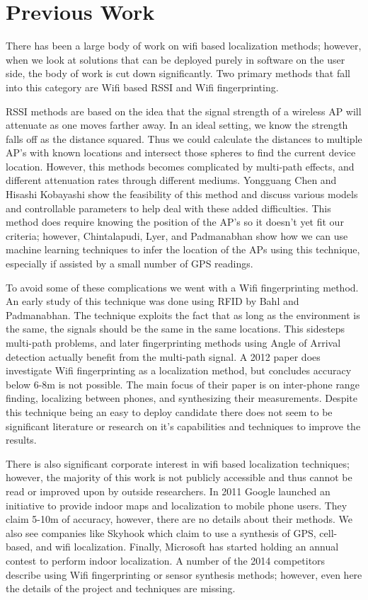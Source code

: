 \documentclass[11pt]{article}
\begin{document}
\section{Previous Work}
There has been a large body of work on wifi based localization methods; however, when we look at solutions that can be deployed purely in software on the user side, the body of work is cut down significantly. Two primary methods that fall into this category are Wifi based RSSI and Wifi fingerprinting.

RSSI methods are based on the idea that the signal strength of a wireless AP will attenuate as one moves farther away. In an ideal setting, we know the strength falls off as the distance squared. Thus we could calculate the distances to multiple AP's with known locations and intersect those spheres to find the current device location. However, this methods becomes complicated by multi-path effects, and different attenuation rates through different mediums. Yongguang Chen and Hisashi Kobayashi show the feasibility of this method and discuss various models and controllable parameters to help deal with these added difficulties.\cite{RSSI1} This method does require knowing the position of the AP's so it doesn't yet fit our criteria; however, Chintalapudi, Lyer, and Padmanabhan show how we can use machine learning techniques to infer the location of the APs using this technique, especially if assisted by a small number of GPS readings.\cite{RSSI2}

To avoid some of these complications we went with a Wifi fingerprinting method. An early study of this technique was done using RFID by Bahl and Padmanabhan. The technique exploits the fact that as long as the environment is the same, the signals should be the same in the same locations. \cite{RFID} This sidesteps multi-path problems, and later fingerprinting methods using Angle of Arrival detection actually benefit from the multi-path signal. A 2012 paper does investigate Wifi fingerprinting as a localization method, but concludes accuracy below 6-8m is not possible. The main focus of their paper is on inter-phone range finding, localizing between phones, and synthesizing their measurements. \cite{Push2012} Despite this technique being an easy to deploy candidate there does not seem to be significant literature or research on it's capabilities and techniques to improve the results.

There is also significant corporate interest in wifi based localization techniques; however, the majority of this work is not publicly accessible and thus cannot be read or improved upon by outside researchers. In 2011 Google launched an initiative to provide indoor maps and localization to mobile phone users. They claim 5-10m of accuracy, however, there are no details about their methods.\cite{CNNGoogle} We also see companies like Skyhook which claim to use a synthesis of GPS, cell-based, and wifi localization.\cite{Skyhook} Finally, Microsoft has started holding an annual contest to perform indoor localization.\cite{Microsoft} A number of the 2014 competitors describe using Wifi fingerprinting or sensor synthesis methods; however, even here the details of the project and techniques are missing.
\end{document}
